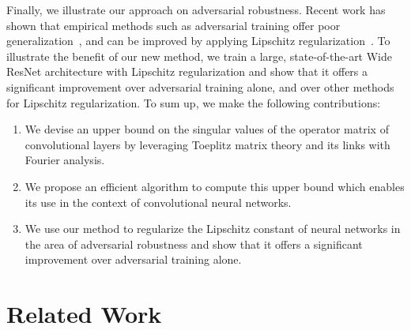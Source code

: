 Finally, we illustrate our approach on adversarial robustness.
Recent work has shown that empirical methods such as adversarial training offer poor generalization~\cite{schmidt2018adversarially}, and can be improved by applying Lipschitz regularization~\cite{farnia2018generalizable}.
To illustrate the benefit of our new method, we train a large, state-of-the-art Wide ResNet architecture with Lipschitz regularization and show that it offers a significant improvement over adversarial training alone, and over other methods for Lipschitz regularization.
To sum up, we make the following  contributions:
\begin{enumerate}
    \item We devise an upper bound on the singular values of the operator matrix of convolutional layers by leveraging Toeplitz matrix theory and its links with Fourier analysis. 
    \item We propose an efficient algorithm to compute this upper bound which enables its use in the context of convolutional neural networks.
    \item We use our method to regularize the Lipschitz constant of neural networks in the area of adversarial robustness and show that it offers a significant improvement over adversarial training alone.
\end{enumerate}

\section{Related Work}
\label{section:ch4-related_work}

